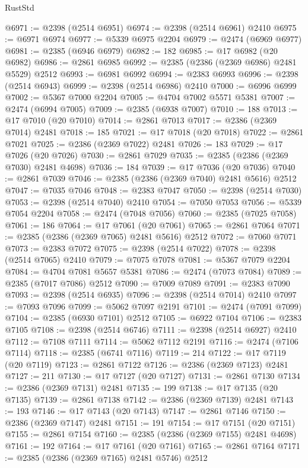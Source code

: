 \begin{lexlean}{RustStd}
\begin{coremodule}
@6971 := @2398 (@2514 @6951)
@6974 := @2398 (@2514 @6961) @2410
@6975 := @6971 @6974
@6977 := @5339 @6975 @2204
@6979 := @2474 (@6969 @6977)
@6981 := @2385 (@6946 @6979)
@6982 := 182
@6985 := @17 @6982 (@20 @6982)
@6986 := @2861 @6985
@6992 := @2385 (@2386 (@2369 @6986) @2481 @5529) @2512
@6993 := @6981 @6992
@6994 := @2383 @6993
@6996 := @2398 (@2514 @6943)
@6999 := @2398 (@2514 @6986) @2410
@7000 := @6996 @6999
@7002 := @5367 @7000 @2204
@7005 := @4704 @7002 @5571 @5381
@7007 := @2474 (@6994 @7005)
@7009 := @2385 (@6938 @7007)
@7010 := 188
@7013 := @17 @7010 (@20 @7010)
@7014 := @2861 @7013
@7017 := @2386 (@2369 @7014) @2481
@7018 := 185
@7021 := @17 @7018 (@20 @7018)
@7022 := @2861 @7021
@7025 := @2386 (@2369 @7022) @2481
@7026 := 183
@7029 := @17 @7026 (@20 @7026)
@7030 := @2861 @7029
@7035 := @2385 (@2386 (@2369 @7030) @2481 @4698)
@7036 := 184
@7039 := @17 @7036 (@20 @7036)
@7040 := @2861 @7039
@7046 := @2385 (@2386 (@2369 @7040) @2481 @5616) @2512
@7047 := @7035 @7046
@7048 := @2383 @7047
@7050 := @2398 (@2514 @7030)
@7053 := @2398 (@2514 @7040) @2410
@7054 := @7050 @7053
@7056 := @5339 @7054 @2204
@7058 := @2474 (@7048 @7056)
@7060 := @2385 (@7025 @7058)
@7061 := 186
@7064 := @17 @7061 (@20 @7061)
@7065 := @2861 @7064
@7071 := @2385 (@2386 (@2369 @7065) @2481 @5616) @2512
@7072 := @7060 @7071
@7073 := @2383 @7072
@7075 := @2398 (@2514 @7022)
@7078 := @2398 (@2514 @7065) @2410
@7079 := @7075 @7078
@7081 := @5367 @7079 @2204
@7084 := @4704 @7081 @5657 @5381
@7086 := @2474 (@7073 @7084)
@7089 := @2385 (@7017 @7086) @2512
@7090 := @7009 @7089
@7091 := @2383 @7090
@7093 := @2398 (@2514 @6935)
@7096 := @2398 (@2514 @7014) @2410
@7097 := @7093 @7096
@7099 := @5062 @7097 @2191
@7101 := @2474 (@7091 @7099)
@7104 := @2385 (@6930 @7101) @2512
@7105 := @6922 @7104
@7106 := @2383 @7105
@7108 := @2398 (@2514 @6746)
@7111 := @2398 (@2514 @6927) @2410
@7112 := @7108 @7111
@7114 := @5062 @7112 @2191
@7116 := @2474 (@7106 @7114)
@7118 := @2385 (@6741 @7116)
@7119 := 214
@7122 := @17 @7119 (@20 @7119)
@7123 := @2861 @7122
@7126 := @2386 (@2369 @7123) @2481
@7127 := 211
@7130 := @17 @7127 (@20 @7127)
@7131 := @2861 @7130
@7134 := @2386 (@2369 @7131) @2481
@7135 := 199
@7138 := @17 @7135 (@20 @7135)
@7139 := @2861 @7138
@7142 := @2386 (@2369 @7139) @2481
@7143 := 193
@7146 := @17 @7143 (@20 @7143)
@7147 := @2861 @7146
@7150 := @2386 (@2369 @7147) @2481
@7151 := 191
@7154 := @17 @7151 (@20 @7151)
@7155 := @2861 @7154
@7160 := @2385 (@2386 (@2369 @7155) @2481 @4698)
@7161 := 192
@7164 := @17 @7161 (@20 @7161)
@7165 := @2861 @7164
@7171 := @2385 (@2386 (@2369 @7165) @2481 @5746) @2512

\end{coremodule}
\end{lexlean}
